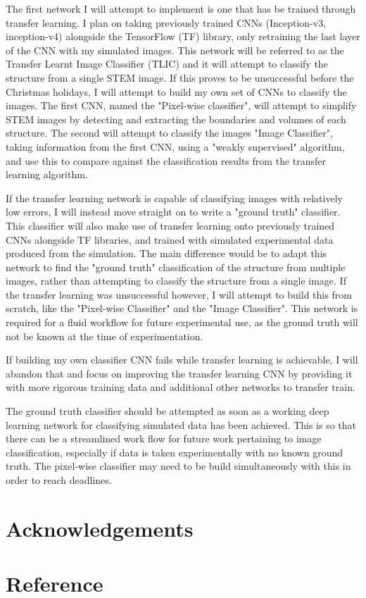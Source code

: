 \documentclass{cookedoc}
\begin{document}
	The first network I will attempt to implement is one that has be trained through transfer learning. I plan on taking previously trained CNNs (Inception-v3, inception-v4) alongside the TensorFlow (TF) library, only retraining the last layer of the CNN with my simulated images. This network will be referred to as the Transfer Learnt Image Classifier (TLIC) and it will attempt to classify the structure from a single STEM image. If this proves to be unsuccessful before the Christmas holidays, I will attempt to build my own set of CNNs to classify the images. The first CNN, named the "Pixel-wise classifier", will attempt to simplify STEM images by detecting and extracting the boundaries and volumes of each structure. The second will attempt to classify the images "Image Classifier", taking information from the first CNN, using a "weakly supervised" algorithm, and use this to compare against the classification results from the transfer learning algorithm. 
	
	If the transfer learning network is capable of classifying images with relatively low errors, I will instead move straight on to write a "ground truth" classifier. This classifier will also make use of transfer learning onto previously trained CNNs alongside TF libraries, and trained with simulated experimental data produced from the simulation. The main difference would be to adapt this network to find the "ground truth" classification of the structure from multiple images, rather than attempting to classify the structure from a single image. If the transfer learning was unsuccessful however, I will attempt to build this from scratch, like the "Pixel-wise Classifier" and the "Image Classifier". This network is required for a fluid workflow for future experimental use, as the ground truth will not be known at the time of experimentation. 
	
	If building my own classifier CNN fails while transfer learning is achievable, I will abandon that and focus on improving the transfer learning CNN by providing it with more rigorous training data and additional other networks to transfer train.
	
	The ground truth classifier should be attempted as soon as a working deep learning network for classifying simulated data has been achieved. This is so that there can be a streamlined work flow for future work pertaining to image classification, especially if data is taken experimentally with no known ground truth. The pixel-wise classifier may need to be build simultaneously with this in order to reach deadlines. 
	
	
	\section*{Acknowledgements}
	
	\section*{Reference}
	
	
\end{document}
